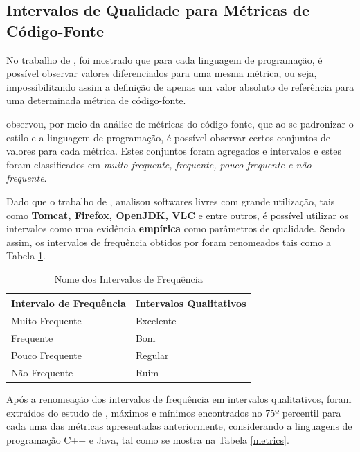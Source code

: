 \subsection{Intervalos de Qualidade para Métricas de Código-Fonte}
\label{Intervalos das Métricas}

No trabalho de , foi mostrado que para cada linguagem de programação, é possível observar valores diferenciados para uma mesma métrica, ou seja, impossibilitando assim a definição de apenas um valor absoluto de referência para uma determinada métrica de código-fonte.

 observou, por meio da análise de métricas do código-fonte, que ao se padronizar o estilo e a linguagem de programação, é possível observar certos conjuntos de valores para cada métrica. Estes conjuntos foram agregados e intervalos e estes foram classificados em \textit{muito frequente, frequente, pouco frequente e não frequente}.

Dado que o trabalho de , analisou softwares livres com grande utilização, tais como \textbf{Tomcat, Firefox, OpenJDK, VLC} e entre outros, é possível utilizar os intervalos como uma evidência \textbf{empírica} como parâmetros de qualidade. Sendo assim, os intervalos de frequência obtidos por  foram renomeados tais como a Tabela \ref{nomes}. 

	\begin{table}[!ht]
	\begin{center}
	 \begin{tabular}{|l|l|}
		\hline
		Intervalo de Frequência & Intervalos Qualitativos \\ \hline
		Muito Frequente & Excelente \\ \hline
		Frequente       & Bom       \\ \hline
		Pouco Frequente & Regular   \\ \hline
		Não Frequente   & Ruim      \\ \hline
		\end{tabular}
		\caption{Nome dos Intervalos de Frequência}
		\label{nomes}
		\end{center}
		\end{table}
		
\FloatBarrier

Após a renomeação dos intervalos de frequência em intervalos qualitativos, 
foram extraídos do estudo de , máximos e mínimos encontrados no 75º percentil para cada uma das métricas apresentadas anteriormente, considerando a linguagens de programação C++ e Java, tal como se mostra na Tabela \ref{metrics}.
	

